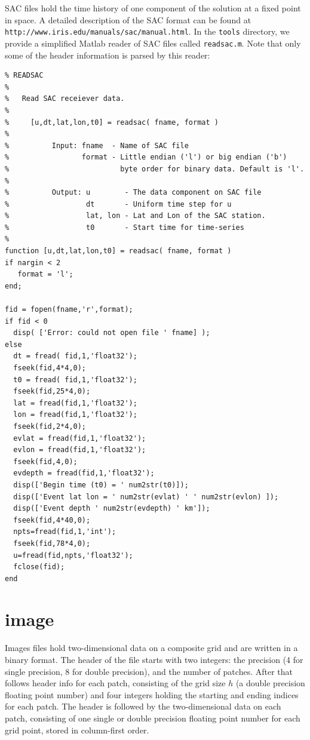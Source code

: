 \documentclass[11pt]{report}
\begin{document}
SAC files hold the time history of one component of the solution at a fixed point in space.  A
detailed description of the SAC format can be found at {\tt
http://www.iris.edu/manuals/sac/manual.html}. In the {\tt tools} directory, we provide a simplified
Matlab reader of SAC files called {\tt readsac.m}. Note that only some of the header information is
parsed by this reader:
\begin{verbatim}
% READSAC
%
%   Read SAC receiever data.
%
%     [u,dt,lat,lon,t0] = readsac( fname, format )
%
%          Input: fname  - Name of SAC file
%                 format - Little endian ('l') or big endian ('b')
%                          byte order for binary data. Default is 'l'.
%
%          Output: u        - The data component on SAC file
%                  dt       - Uniform time step for u
%                  lat, lon - Lat and Lon of the SAC station.
%                  t0       - Start time for time-series
%
function [u,dt,lat,lon,t0] = readsac( fname, format )
if nargin < 2 
   format = 'l';
end;

fid = fopen(fname,'r',format);
if fid < 0 
  disp( ['Error: could not open file ' fname] );
else
  dt = fread( fid,1,'float32');    
  fseek(fid,4*4,0);
  t0 = fread( fid,1,'float32');    
  fseek(fid,25*4,0);
  lat = fread(fid,1,'float32');
  lon = fread(fid,1,'float32');
  fseek(fid,2*4,0);
  evlat = fread(fid,1,'float32');
  evlon = fread(fid,1,'float32');
  fseek(fid,4,0);
  evdepth = fread(fid,1,'float32');
  disp(['Begin time (t0) = ' num2str(t0)]);
  disp(['Event lat lon = ' num2str(evlat) ' ' num2str(evlon) ]);
  disp(['Event depth ' num2str(evdepth) ' km']);
  fseek(fid,4*40,0);
  npts=fread(fid,1,'int');
  fseek(fid,78*4,0);
  u=fread(fid,npts,'float32');
  fclose(fid);
end
\end{verbatim}

\section{image}\label{sec:image-format}

Images files hold two-dimensional data on a composite grid and are written in a binary format. The
header of the file starts with two integers: the precision (4 for single precision, 8 for double
precision), and the number of patches. After that follows header info for each patch, consisting of
the grid size $h$ (a double precision floating point number) and four integers holding the starting
and ending indices for each patch. The header is followed by the two-dimensional data on each patch,
consisting of one single or double precision floating point number for each grid point, stored in
column-first order. 
\end{document}
